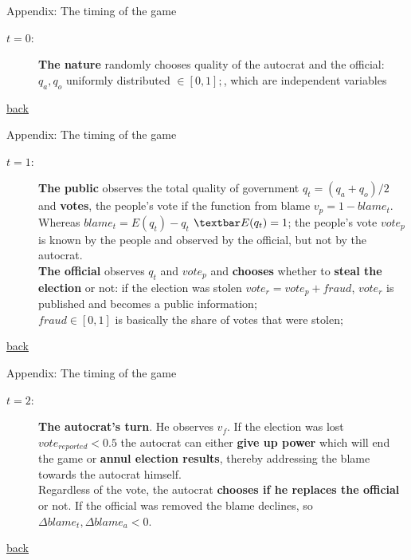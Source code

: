 \documentclass{beamer}
\begin{document}
\begin{frame}{\hypertarget{time1}{Appendix: The timing of the game}}
    \begin{description}
	    \item[$t = 0$:] {\textbf{The nature} randomly chooses quality of the autocrat and the official: $q_a, q_o$ uniformly distributed $\in [0,1];$, which are independent variables}
    \end{description}
    \hyperlink{time}{back}
\end{frame}

\begin{frame}{\hypertarget{time2}{Appendix: The timing of the game}}
    \begin{description}
	    \item[$t = 1$:] { \textbf{The public} observes the total quality of government $q_t = (q_a +q_o) /2$ and \textbf{votes}, the people's vote if the function from blame $v_p = 1-blame_t$. Whereas $blame_t = E(q_t) - q_t$ $\textbar E(q_t) = 1$; the people's vote $vote_p$ is known by the people and observed by the official, but not by the autocrat.\\
	    \textbf{The official} observes $q_t$ and $vote_p$ and \textbf{chooses} whether to \textbf{steal the election} or not: if the election was stolen $vote_r = vote_p + fraud$, $vote_r$ is published and becomes a public information;\\
	    $fraud \in [0,1]$ is basically the share of votes that were stolen;}
    \end{description}
    \hyperlink{time}{back}
\end{frame}

\begin{frame}{\hypertarget{time3}{Appendix: The timing of the game}}
    \begin{description}
    \item[$t = 2$:] {\textbf{The autocrat's turn}. He observes $v_f$. If the election was lost $vote_{reported} < 0.5$ the autocrat can either \textbf{give up power} which will end the game or \textbf{annul election results}, thereby addressing the blame towards the autocrat himself.\\
	    Regardless of the vote, the autocrat \textbf{chooses if he replaces the official} or not. If the official was removed the blame declines, so $\Delta blame_t, \Delta blame_a < 0$.}	   
	\end{description}
	\hyperlink{time}{back}
\end{frame}
\end{document}
